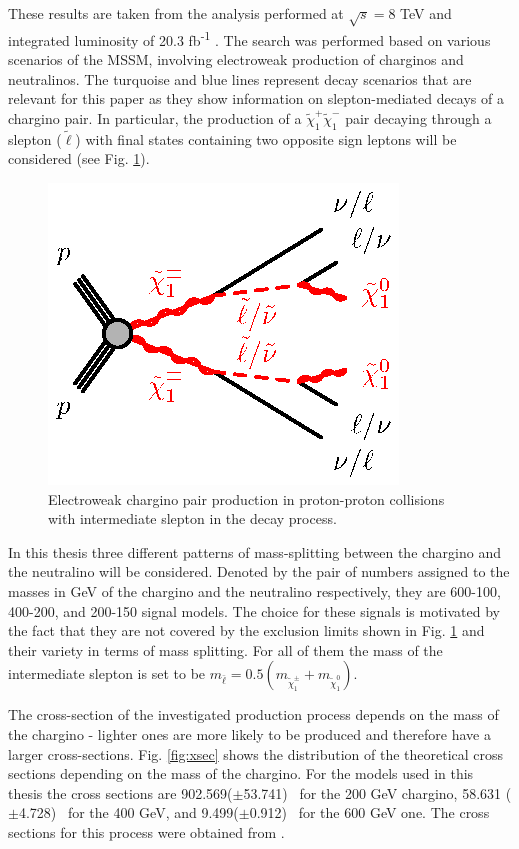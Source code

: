 These results are taken from the  analysis performed at $\sqrt{s}=$8 TeV and integrated luminosity of 20.3 fb\textsuperscript{-1} \citep{atlas2015search}. The search was performed based on various scenarios of the MSSM, involving electroweak production of charginos and neutralinos. The turquoise and blue lines represent decay scenarios that are relevant for this paper as they show information on slepton-mediated decays of a chargino pair. 
In particular, the production of a  $\tilde{\chi}^{+}_{1}\tilde{\chi}^{-}_{1}$ pair decaying through a slepton ($\tilde{\ell}$) with final states containing two opposite sign leptons will be considered (see Fig. \ref{fig:EWchargino}). 
\begin{figure}[!h]
  \centering   	
  	\captionsetup{width=0.8\textwidth}
	\includegraphics[]{Chap2/C1C1-llvvN1N1-slsnu}	
\caption[Feynman diagram of slepton-mediated chargino decay]{Electroweak chargino pair production in proton-proton collisions with intermediate slepton in the decay process.}\label{fig:EWchargino}
\end{figure}  
\newpage
In this thesis three different patterns of mass-splitting between the chargino and the neutralino will be considered. Denoted by the pair of numbers assigned to the masses in GeV of the chargino and the neutralino respectively, they are 600-100, 400-200, and 200-150 signal models. The choice for these signals is motivated by the fact that they are not covered by the exclusion limits shown in Fig. \ref{fig:EWchargino} and their variety in terms of mass splitting.
For all of them the mass of the intermediate slepton is set to be $m_{\bar{\ell}} = 0.5(m_{\tilde{\chi}_1^{\pm}}+m_{\tilde{\chi}_1^{0}})$. 

The cross-section of the investigated production process depends on the mass of the chargino - lighter ones are more likely to be produced and therefore have a larger cross-sections. Fig. \ref{fig:xsec} shows the distribution of the theoretical cross sections depending on the mass of the chargino. For the models used in this thesis the cross sections are 902.569($\pm$53.741) \invfb \, for the 200 GeV chargino, 58.631 ($\pm$4.728)  \invfb \, for the 400 GeV, and 9.499($\pm$0.912) \invfb \, for the 600 GeV one.
The cross sections for this process were obtained from \citep{Fuks:2012qx,Fuks:2013vua}. 

